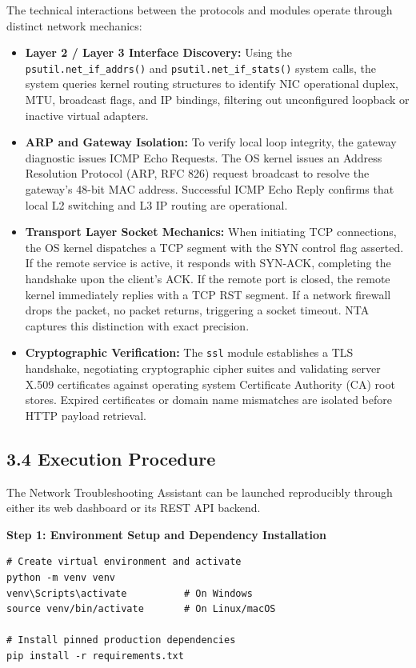 \documentclass[
]{article}
\providecommand{\tightlist}{%
  \setlength{\itemsep}{0pt}\setlength{\parskip}{0pt}}
\begin{document}
The technical interactions between the protocols and modules operate through distinct network mechanics:
\begin{itemize}
\tightlist
\item \textbf{Layer 2 / Layer 3 Interface Discovery:} Using the \texttt{psutil.net\_if\_addrs()} and \texttt{psutil.net\_if\_stats()} system calls, the system queries kernel routing structures to identify NIC operational duplex, MTU, broadcast flags, and IP bindings, filtering out unconfigured loopback or inactive virtual adapters.
\item \textbf{ARP and Gateway Isolation:} To verify local loop integrity, the gateway diagnostic issues ICMP Echo Requests. The OS kernel issues an Address Resolution Protocol (ARP, RFC 826) request broadcast to resolve the gateway's 48-bit MAC address. Successful ICMP Echo Reply confirms that local L2 switching and L3 IP routing are operational.
\item \textbf{Transport Layer Socket Mechanics:} When initiating TCP connections, the OS kernel dispatches a TCP segment with the SYN control flag asserted. If the remote service is active, it responds with SYN-ACK, completing the handshake upon the client's ACK. If the remote port is closed, the remote kernel immediately replies with a TCP RST segment. If a network firewall drops the packet, no packet returns, triggering a socket timeout. NTA captures this distinction with exact precision.
\item \textbf{Cryptographic Verification:} The \texttt{ssl} module establishes a TLS handshake, negotiating cryptographic cipher suites and validating server X.509 certificates against operating system Certificate Authority (CA) root stores. Expired certificates or domain name mismatches are isolated before HTTP payload retrieval.
\end{itemize}

\subsection{3.4 Execution Procedure}\label{execution-procedure}

The Network Troubleshooting Assistant can be launched reproducibly through either its web dashboard or its REST API backend.

\vspace{0.2cm}
\textbf{Step 1: Environment Setup and Dependency Installation}
\begin{verbatim}
# Create virtual environment and activate
python -m venv venv
venv\Scripts\activate          # On Windows
source venv/bin/activate       # On Linux/macOS

# Install pinned production dependencies
pip install -r requirements.txt
\end{verbatim}
\end{document}

